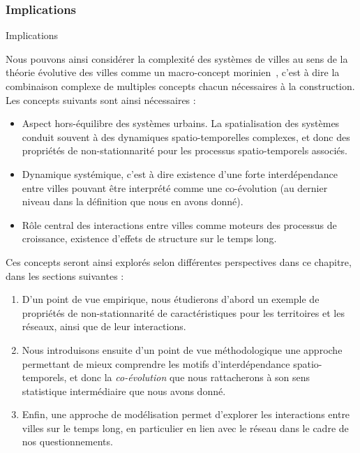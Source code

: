 \subsubsection*{Implications}{Implications}


Nous pouvons ainsi considérer la complexité des systèmes de villes au sens de la théorie évolutive des villes comme un macro-concept morinien~\cite{morin1976methode}, c'est à dire la combinaison complexe de multiples concepts chacun nécessaires à la construction. Les concepts suivants sont ainsi nécessaires :
\begin{itemize}
	\item Aspect hors-équilibre des systèmes urbains. La spatialisation des systèmes conduit souvent à des dynamiques spatio-temporelles complexes, et donc des propriétés de non-stationnarité pour les processus spatio-temporels associés. %
	\item Dynamique systémique, c'est à dire existence d'une forte interdépendance entre villes pouvant être interprété comme une co-évolution (au dernier niveau dans la définition que nous en avons donné).
	\item Rôle central des interactions entre villes comme moteurs des processus de croissance, existence d'effets de structure sur le temps long.
\end{itemize}


Ces concepts seront ainsi explorés selon différentes perspectives dans ce chapitre, dans les sections suivantes :
\begin{enumerate}
	\item D'un point de vue empirique, nous étudierons d'abord un exemple de propriétés de non-stationnarité de caractéristiques pour les territoires et les réseaux, ainsi que de leur interactions.
	\item Nous introduisons ensuite d'un point de vue méthodologique une approche permettant de mieux comprendre les motifs d'interdépendance spatio-temporels, et donc la \emph{co-évolution} que nous rattacherons à son sens statistique intermédiaire que nous avons donné.
	\item Enfin, une approche de modélisation permet d'explorer les interactions entre villes sur le temps long, en particulier en lien avec le réseau dans le cadre de nos questionnements.
\end{enumerate}




\stars






